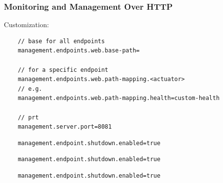 \documentclass{scrartcl}
\begin{document}
\subsubsection{Monitoring and Management Over HTTP}

Customization:

\begin{lstlisting}
    // base for all endpoints
    management.endpoints.web.base-path=

    // for a specific endpoint
    management.endpoints.web.path-mapping.<actuator>
    // e.g.
    management.endpoints.web.path-mapping.health=custom-health

    // prt
    management.server.port=8081
\end{lstlisting}

\begin{lstlisting}
    management.endpoint.shutdown.enabled=true
\end{lstlisting}
\begin{lstlisting}
    management.endpoint.shutdown.enabled=true
\end{lstlisting}
\begin{lstlisting}
    management.endpoint.shutdown.enabled=true
\end{lstlisting}
\end{document}
